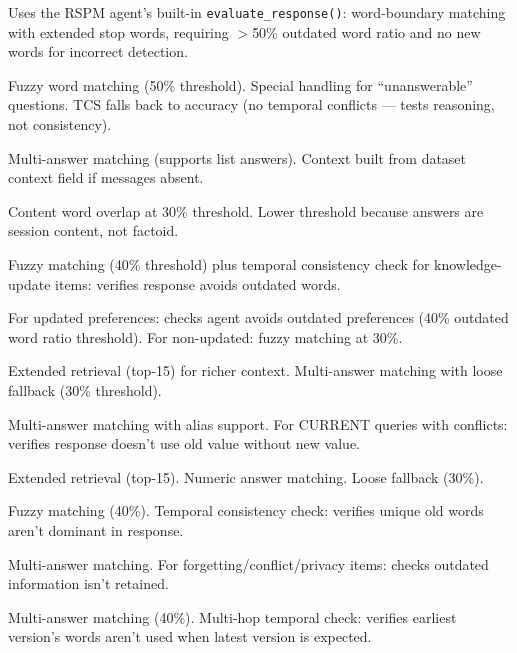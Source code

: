 \documentclass[11pt,a4paper]{article}
\begin{document}
\begin{description}[style=nextline]
    \item[\texttt{HaluMem}] Uses the RSPM agent's built-in \texttt{evaluate\_response()}: word-boundary matching with extended stop words, requiring $>$50\% outdated word ratio and no new words for incorrect detection.
    
    \item[\texttt{LoCoMo}] Fuzzy word matching (50\% threshold). Special handling for ``unanswerable'' questions. TCS falls back to accuracy (no temporal conflicts --- tests reasoning, not consistency).
    
    \item[\texttt{TimeBench}] Multi-answer matching (supports list answers). Context built from dataset context field if messages absent.
    
    \item[\texttt{TemporalMemory}] Content word overlap at 30\% threshold. Lower threshold because answers are session content, not factoid.
    
    \item[\texttt{LongMemEval}] Fuzzy matching (40\% threshold) plus temporal consistency check for knowledge-update items: verifies response avoids outdated words.
    
    \item[\texttt{PersonaMem}] For updated preferences: checks agent avoids outdated preferences (40\% outdated word ratio threshold). For non-updated: fuzzy matching at 30\%.
    
    \item[\texttt{MemoryAgentBench}] Extended retrieval (top-15) for richer context. Multi-answer matching with loose fallback (30\% threshold).
    
    \item[\texttt{AToKe}] Multi-answer matching with alias support. For CURRENT queries with conflicts: verifies response doesn't use old value without new value.
    
    \item[\texttt{MEMTRACK}] Extended retrieval (top-15). Numeric answer matching. Loose fallback (30\%).
    
    \item[\texttt{DynaQuest}] Fuzzy matching (40\%). Temporal consistency check: verifies unique old words aren't dominant in response.
    
    \item[\texttt{FiFA-Synth}] Multi-answer matching. For forgetting/conflict/privacy items: checks outdated information isn't retained.
    
    \item[\texttt{ReviseQA-Synth}] Multi-answer matching (40\%). Multi-hop temporal check: verifies earliest version's words aren't used when latest version is expected.
\end{description}
\end{document}
